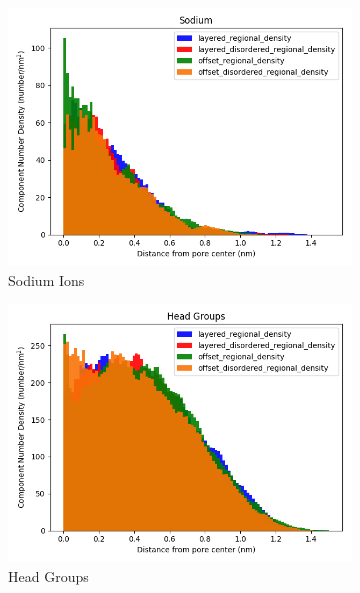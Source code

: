\documentclass[journal=jpcbfk,manusciprt=article]{achemso}
\begin{document}
  \begin{figure}
  \centering
  \begin{subfigure}{0.32\textwidth}
        \includegraphics[width=1\linewidth]{sodium_density.png}
        \caption{Sodium Ions}
        \label{fig:sodium_regional_density}
  \end{subfigure}
  \begin{subfigure}{0.32\textwidth}
        \includegraphics[width=1\linewidth]{head_group_density.png}
        \caption{Head Groups}
        \label{fig:head_groups_regional_density}
  \end{subfigure}
  \begin{subfigure}{0.32\textwidth}

\end{subfigure}
\end{figure}
\end{document}
